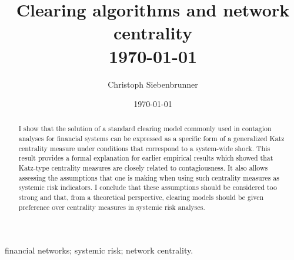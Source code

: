 \documentclass[authoryear,12pt]{elsarticle}
\begin{document}
\begin{frontmatter}

\title{Clearing algorithms and network centrality \\ \vspace{12pt}
\small{\today}
}


\author{Christoph Siebenbrunner}


\date{\today}

\begin{abstract}
I show that the solution of a standard clearing model commonly used in contagion analyses for financial systems can be expressed as a specific form of a generalized Katz centrality measure under conditions that %
correspond to a system-wide shock. This result provides a formal explanation for earlier empirical results which showed that Katz-type centrality measures are closely related to contagiousness. It also allows assessing the assumptions that one is making when using such centrality measures as systemic risk indicators. I conclude that these assumptions should be considered too strong and that, from a theoretical perspective, clearing models should be given preference over centrality measures in systemic risk analyses.
\end{abstract}

\begin{keyword}
financial networks; systemic risk; network centrality. \\
\end{keyword}

\end{frontmatter}
\end{document}
